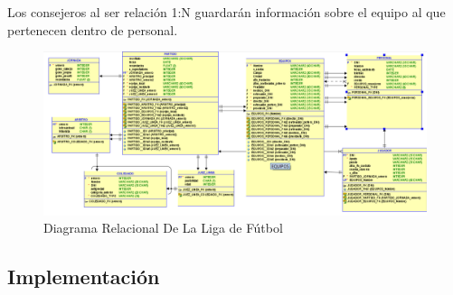 \documentclass{article}
\begin{document}
Los consejeros al ser relación 1:N guardarán información sobre el equipo al que pertenecen dentro de personal.
\\

\begin{figure}[H]
	\centering
	\includegraphics[width=\textwidth]{images/diagrama_relacional_futbol.png}
	\caption{Diagrama Relacional De La Liga de Fútbol}
	\label{fig:f_relacional}
\end{figure}

\newpage
\subsection{Implementación}
\end{document}
